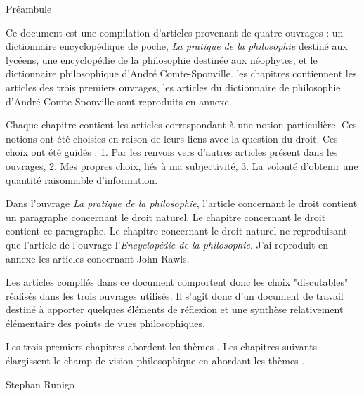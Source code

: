 
\thispagestyle{empty}

\begin{center}
\Large
Préambule
\normalsize
\end{center}
\vspace{3cm}

Ce document est une compilation d'articles provenant de quatre ouvrages : un dictionnaire encyclopédique de poche, {\it La pratique de la philosophie} destiné aux lycéens, une encyclopédie de la philosophie destinée aux néophytes, et le dictionnaire philosophique d'André Comte-Sponville.
les chapitres contiennent les articles des trois premiers ouvrages, les articles du dictionnaire de philosophie d'André Comte-Sponville sont reproduits en annexe.

\vspace{1.3cm}


Chaque chapitre contient les articles correspondant à une notion particulière. Ces notions ont été choisies en raison de leurs liens avec la question du droit. Ces choix ont été guidés : 1. Par les renvois vers d'autres articles présent dans les ouvrages, 2. Mes propres choix, liés à ma subjectivité, 3. La volonté d'obtenir une quantité raisonnable d'information.

\vspace{1.3cm}

Dans l'ouvrage {\it La pratique de la philosophie}, l'article concernant le droit contient un paragraphe concernant le droit naturel. Le chapitre concernant le droit contient ce paragraphe. Le chapitre concernant le droit naturel ne reproduisant que l'article de l'ouvrage l'{\it Encyclopédie de la philosophie}.
J'ai reproduit en annexe les articles concernant John Rawls.

Les articles compilés dans ce document comportent donc les choix "discutables" réalisés dans les trois ouvrages utilisés. Il s'agit donc d'un document de travail destiné à apporter quelques éléments de réflexion et une synthèse relativement élémentaire des points de vues philosophiques.

\vspace{1.3cm}

Les trois premiers chapitres abordent les thèmes 
.
 Les chapitres suivants élargissent le champ de vision philosophique en abordant les thèmes .

\vspace{2.3cm}

\hfill Stephan Runigo

